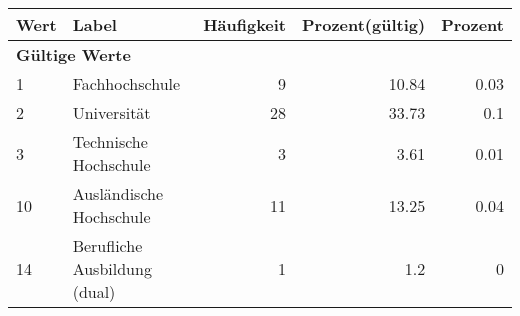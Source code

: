      \begin{longtable}{lXrrr}
     \toprule
     \textbf{Wert} & \textbf{Label} & \textbf{Häufigkeit} & \textbf{Prozent(gültig)} & \textbf{Prozent} \\
     \endhead
     \midrule
     \multicolumn{5}{l}{\textbf{Gültige Werte}}\\

     1 &
     \multicolumn{1}{X}{ Fachhochschule   } &


       \num{9} &
       \num[round-mode=places,round-precision=2]{10.84} &
         \num[round-mode=places,round-precision=2]{0.03} \\

     2 &
     \multicolumn{1}{X}{ Universität   } &


       \num{28} &
       \num[round-mode=places,round-precision=2]{33.73} &
         \num[round-mode=places,round-precision=2]{0.1} \\

     3 &
     \multicolumn{1}{X}{ Technische Hochschule   } &


       \num{3} &
       \num[round-mode=places,round-precision=2]{3.61} &
         \num[round-mode=places,round-precision=2]{0.01} \\

     10 &
     \multicolumn{1}{X}{ Ausländische Hochschule   } &


       \num{11} &
       \num[round-mode=places,round-precision=2]{13.25} &
         \num[round-mode=places,round-precision=2]{0.04} \\

     14 &
     \multicolumn{1}{X}{ Berufliche Ausbildung (dual)   } &


       \num{1} &
       \num[round-mode=places,round-precision=2]{1.2} &
         \num[round-mode=places,round-precision=2]{0} \\


\end{longtable}
